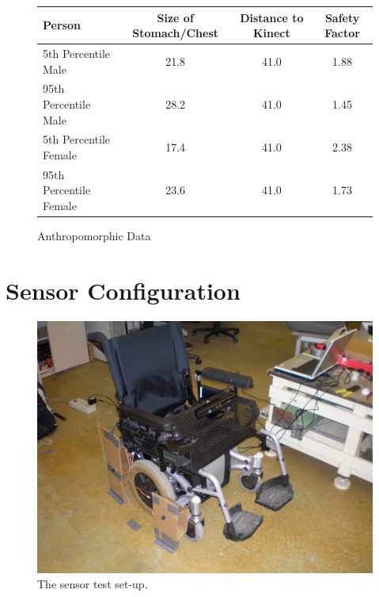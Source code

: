 \documentclass[oneside,final,a4paper]{report}
\begin{document}
\begin{figure}[ht]
\centering
\begin{tabular}{|l|c|c|c|}
\hline
Person & Size of Stomach/Chest & Distance to Kinect & Safety Factor \\
\hline \hline
5th Percentile Male&21.8&	41.0&1.88\\
\hline
95th Percentile Male&28.2&41.0&1.45\\
\hline
5th Percentile Female&17.4&41.0&2.38\\
\hline
95th Percentile Female&23.6&41.0&1.73\\
\hline
\end{tabular}
\caption{Anthropomorphic Data}
\label{tab:anthro_data}
\end{figure}


\section{Sensor Configuration}
\begin{figure}[hbt]
 \centering
 \includegraphics[scale=0.1]{testing}
 \caption{The sensor test set-up.}\label{fig:testing}
\end{figure}
\end{document}
